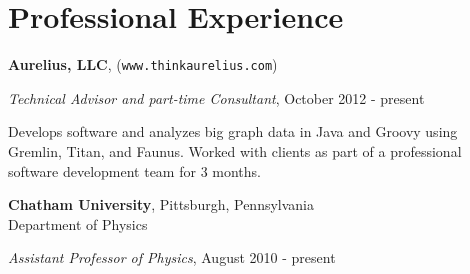 \section{\sc Professional Experience} %

%

{\bf Aurelius, LLC}, (\texttt{www.thinkaurelius.com})\\
\begin{list1}
\vspace{-4mm}
\item[] {\em  Technical Advisor and part-time Consultant}, October 2012 - present
\item[] Develops software and analyzes big graph data in Java and Groovy using Gremlin, Titan, and Faunus. Worked with clients as part of a professional software development team for 3 months.
\end{list1}




{\bf Chatham University}, Pittsburgh, Pennsylvania\\
Department of Physics
\begin{list1}
\item[] {\em  Assistant Professor of Physics}, August 2010 - present
\end{list1}



